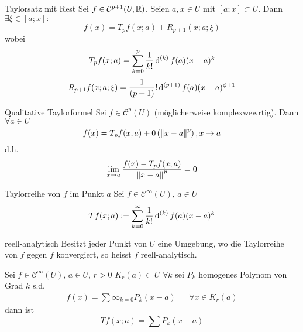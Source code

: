 \begin{Def}{Taylorsatz mit Rest}
  Sei $f\in\mathcal{C}^{p+1}(U,\mathbb{R})$. Seien $a,x\in U$ mit $[a;x]\subset U$. Dann $\exists\xi\in [a;x]:$
  \[f(x)=T_pf(x;a)+R_{p+1}\left( x;a;\xi \right)\]
  wobei
  \[T_pf(x;a)=\sum^p_{k=0}\frac{1}{k!}\operatorname{d}^{(k)}f(a)(x-a)^k\]
  \[R_{p+1}f(x;a;\xi)=\frac{1}{\left( p+1 \right)}!\operatorname{d}^{(p+1)}f(a)(x-a)^{\phi+1}\]
\end{Def}
\begin{Kor}{Qualitative Taylorformel}
  Sei $f\in\mathcal{C}^p(U)$ (möglicherweise komplexwewrtig). Dann $\forall a\in U$
  \[f(x)=T_pf(x,a)+0\left( \left\| x-a \right\|^p \right), x\to a\]
  d.h.
  \[\lim_{x\to a}\frac{f(x)-T_pf(x;a)}{\left\| x-a \right\|^p}=0\]
\end{Kor}
\begin{Def}{Taylorreihe von $f$ im Punkt $a$}
  Sei $f\in\mathcal{C}^\infty(U)$, $a\in U$
  \[Tf(x;a):=\sum^\infty_{k=0}\frac{1}{k!}\operatorname{d}^{(k)}f(a)(x-a)^k\]
\end{Def}
\begin{Def}{reell-analytisch}
  Besitzt jeder Punkt von $U$ eine Umgebung, wo die Taylorreihe von $f$ gegen $f$ konvergiert, so heisst $f$ reell-analytisch.  
\end{Def}
\begin{Lem}
  Sei $f\in\mathcal{C}^\infty(U)$, $a\in U$, $r>0$ $K_r(a)\subset U$ $\forall k$ sei $P_k$ homogenes Polynom von Grad $k$ s.d.
  \begin{align*}
    f(x)=\sum\infty_{k=0}P_k(x-a)&&\forall x\in K_r(a)
  \end{align*}
  dann ist
  \[Tf(x;a)=\sum P_k(x-a)\]
\end{Lem}
